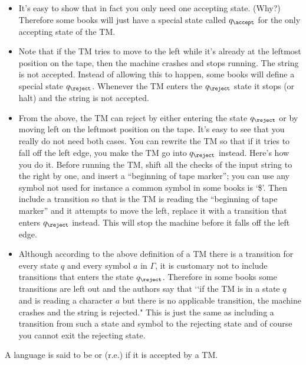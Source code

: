 \begin{defn}
\begin{itemize}
 \item It's easy to show that in fact you only need one accepting
 state. (Why?) Therefore some books will just have a special state
 called $q_{\accept}$ for the only accepting state of the TM.
 \item Note that if the TM tries to move to the left while it's already at the leftmost
 position on the tape, then the machine crashes and stops running. The string is not accepted.
 Instead of allowing this to happen, some books will define a
 special state $q_{\reject}$. Whenever the TM enters the $q_\reject$ state it
 stops (or halt) and the string is not accepted.
 \item From the above, the TM can reject by either entering the
 state $q_{\reject}$ or by moving left on the leftmost position on
 the tape. It's easy to see that you really do not need both
 cases. You can rewrite the TM so that if it tries to fall off the
 left edge, you make the TM go into $q_{\reject}$ instead. Here's
 how you do it. Before running the TM, shift all the checks of the
 input string to the right by one, and insert a ``beginning of tape
 marker''; you can use any symbol not used for instance a common symbol in some books is `\$'.
 Then include a transition so that is the TM is reading
 the ``beginning of tape marker'' and it attempts to move the
 left, replace it with a transition that enters $q_{\reject}$
 instead. This will stop the machine before it falls off the left
 edge.
 \item Although according to the above definition of a TM there is
 a transition for every state $q$ and every symbol $a$ in
 $\Gamma$, it is customary not to include transitions that enters
 the state $q_{\reject}$. Therefore in some books some transitions
 are left out and the authors say that \lq\lq if the TM is in a state $q$
 and is reading a character $a$ but there is no applicable
 transition, the machine crashes and the string is rejected." This
 is just the same as including a transition from such a state and
 symbol to the rejecting state and of course you cannot exit the
 rejecting state.
 \end{itemize}
\end{defn}

\begin{defn}
A language is said to be 
or
 (r.e.)
if it is accepted by a TM.
\end{defn}

